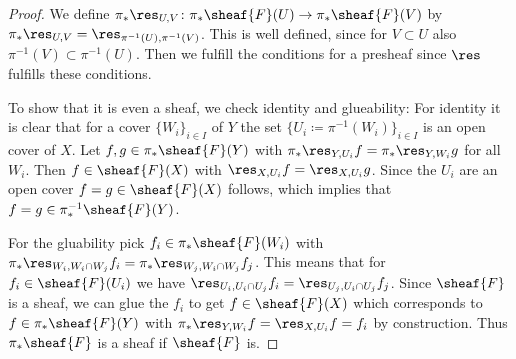 \begin{proof}
  We define $\pi_*\res_{U,V}\colon \pi_*\sheaf{F}(U)\rightarrow
  \pi_*\sheaf{F}(V)$ by $\pi_*\res_{U,V}=
  \res_{\pi^{-1}(U),\pi^{-1}(V)}$. This is well defined, since for
  $V\subset U$ also $\pi^{-1}(V)\subset \pi^{-1}(U)$. Then we fulfill
  the conditions for a presheaf since $\res$ fulfills these
  conditions.

  To show that it is even a sheaf, we check identity and glueability:
  For identity it is clear that for a cover $\{W_i\}_{i\in I}$ of $Y$
  the set $\{U_i\coloneqq \pi^{-1}(W_i)\}_{i\in I}$ is an open cover
  of $X$. Let $f,g\in \pi_*\sheaf{F}(Y)$ with $\pi_*\res_{Y,U_i}f=
  \pi_*\res_{Y,W_i}g$ for all $W_i$. Then $f\in \sheaf{F}(X)$ with
  $\res_{X,U_i}f= \res_{X,U_i}g$. Since the $U_i$ are an open cover $f
  = g \in \sheaf{F}(X)$ follows, which implies that $f=g \in
  \pi_*^{-1}\sheaf{F}(Y)$.

  For the gluability pick $f_i \in \pi_*\sheaf{F}(W_i)$ with
  $\pi_*\res_{W_i,W_i\cap W_j} f_i = \pi_*\res_{W_j,W_i\cap
    W_j}f_j$. This means that for $f_i\in \sheaf{F}(U_i)$ we have
  $\res_{U_i,U_i\cap U_j}f_i = \res_{U_j,U_i\cap U_j}f_j$. Since
  $\sheaf{F}$ is a sheaf, we can glue the $f_i$ to get $f\in
  \sheaf{F}(X)$ which corresponds to $f\in \pi_*\sheaf{F}(Y)$ with
  $\pi_*\res_{Y,W_i}f = \res_{X,U_i}f = f_i$ by construction.
  Thus $\pi_*\sheaf{F}$ is a sheaf if $\sheaf{F}$ is.
\end{proof}

